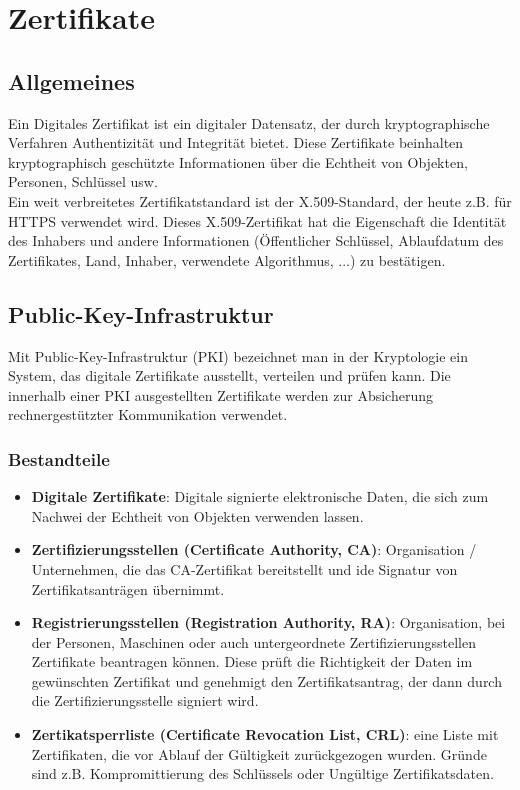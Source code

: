 \chapter{Zertifikate}

\section{Allgemeines}

Ein Digitales Zertifikat ist ein digitaler Datensatz, der durch kryptographische Verfahren Authentizität und Integrität bietet. Diese Zertifikate beinhalten kryptographisch geschützte Informationen über die Echtheit von Objekten, Personen, Schlüssel usw.\\
Ein weit verbreitetes Zertifikatstandard ist der X.509-Standard, der heute z.B. für HTTPS verwendet wird. Dieses X.509-Zertifikat hat die Eigenschaft die Identität des Inhabers und andere Informationen (Öffentlicher Schlüssel, Ablaufdatum des Zertifikates, Land, Inhaber, verwendete Algorithmus, ...) zu bestätigen. 

\section{Public-Key-Infrastruktur}

Mit Public-Key-Infrastruktur (PKI) bezeichnet man in der Kryptologie ein System, das digitale Zertifikate ausstellt, verteilen und prüfen kann. Die innerhalb einer PKI ausgestellten Zertifikate werden zur Absicherung rechnergestützter Kommunikation verwendet.

\subsection{Bestandteile}

\begin{itemize}
\item \textbf{Digitale Zertifikate}: Digitale signierte elektronische Daten, die sich zum Nachwei der Echtheit von Objekten verwenden lassen.
\item \textbf{Zertifizierungsstellen (Certificate Authority, CA)}: Organisation / Unternehmen, die das CA-Zertifikat bereitstellt und ide Signatur von Zertifikatsanträgen übernimmt.
\item \textbf{Registrierungsstellen (Registration Authority, RA)}: Organisation, bei der Personen, Maschinen oder auch untergeordnete Zertifizierungsstellen Zertifikate beantragen können. Diese prüft die Richtigkeit der Daten im gewünschten Zertifikat und genehmigt den Zertifikatsantrag, der dann durch die Zertifizierungsstelle signiert wird.
\item \textbf{Zertikatsperrliste (Certificate Revocation List, CRL)}: eine Liste mit Zertifikaten, die vor Ablauf der Gültigkeit zurückgezogen wurden. Gründe sind z.B. Kompromittierung des Schlüssels oder Ungültige Zertifikatsdaten.
\end{itemize}

